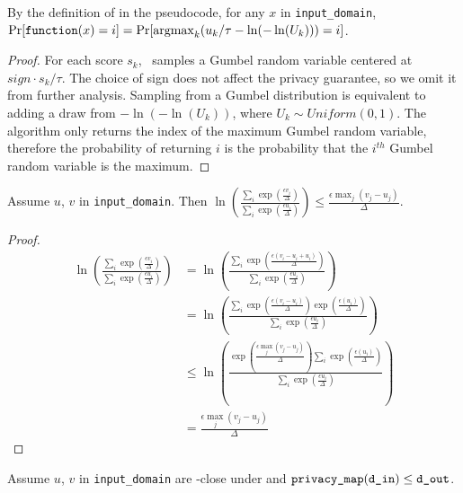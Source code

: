 \documentclass{article}
\begin{document}
\begin{lemma}
    \label{function-prob}
    By the definition of \function in the pseudocode, for any $x$ in \texttt{input\_domain},
    $\Pr[\texttt{function}(x) = i] = \Pr[\mathrm{argmax}_k (u_k / \tau - \ln(-\ln(U_k))) = i]$.
\end{lemma}

\begin{proof}
    For each score $s_k$, \function\ samples a Gumbel random variable centered at $sign \cdot s_k / \tau$.
    The choice of sign does not affect the privacy guarantee, so we omit it from further analysis.
    Sampling from a Gumbel distribution is equivalent to adding a draw from $-\ln(-\ln(U_k))$, where $U_k \sim Uniform(0, 1)$.
    The algorithm only returns the index of the maximum Gumbel random variable,
    therefore the probability of returning $i$ is the probability that the $i^{th}$ Gumbel random variable is the maximum.
\end{proof}

\begin{lemma}
    \label{priv-inequality}
    Assume $u$, $v$ in \texttt{input\_domain}. Then
    $\ln\left(\frac{\sum_{i} \exp(\frac{\epsilon v_i}{\Delta})}{\sum_{i} \exp(\frac{\epsilon u_i}{\Delta})}\right) \le \frac{\epsilon \max_j (v_j - u_j)}{\Delta}$.
\end{lemma}

\begin{proof}
\begin{align*}
    \ln\left(\frac{\sum_{i} \exp(\frac{\epsilon v_i}{\Delta})}{\sum_{i} \exp(\frac{\epsilon u_i}{\Delta})}\right)
    &= \ln\left(\frac{\sum_{i} \exp(\frac{\epsilon (v_i - u_i + u_i)}{\Delta})}{\sum_{i} \exp(\frac{\epsilon u_i}{\Delta})}\right) \\
    &= \ln\left(\frac{\sum_{i} \exp(\frac{\epsilon (v_i - u_i)}{\Delta})\exp(\frac{\epsilon (u_i)}{\Delta})}{\sum_{i} \exp(\frac{\epsilon u_i}{\Delta})}\right) \\
    &\le \ln\left(\frac{\exp(\frac{\epsilon \max_j(v_j - u_j)}{\Delta}) \sum_{i} \exp(\frac{\epsilon (u_i)}{\Delta})}{\sum_{i} \exp(\frac{\epsilon u_i}{\Delta})}\right) \\
    &= \frac{\epsilon \max_j(v_j - u_j)}{\Delta}
\end{align*}
\end{proof}

\label{privacy-guarantee}
Assume $u$, $v$ in \texttt{input\_domain} are \din-close under  and $\texttt{privacy\_map}(\texttt{d\_in}) \le \texttt{d\_out}$.
\end{document}
